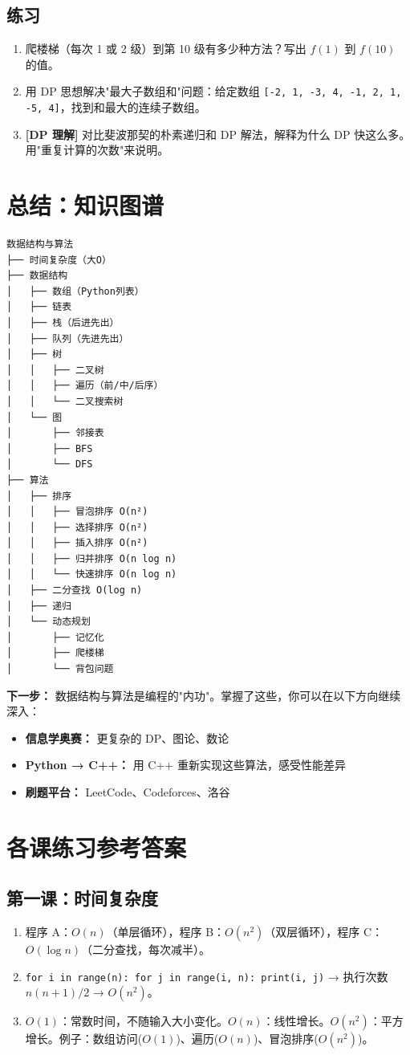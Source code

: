 \documentclass[a4paper,12pt]{ctexart}
\begin{document}
\subsection*{练习}

\begin{enumerate}
  \item 爬楼梯（每次 1 或 2 级）到第 10 级有多少种方法？写出 $f(1)$ 到 $f(10)$ 的值。
  \item 用 DP 思想解决"最大子数组和"问题：给定数组 \texttt{[-2, 1, -3, 4, -1, 2, 1, -5, 4]}，找到和最大的连续子数组。
  \item \textbf{[DP 理解]} 对比斐波那契的朴素递归和 DP 解法，解释为什么 DP 快这么多。用"重复计算的次数"来说明。
\end{enumerate}

\section*{总结：知识图谱}

\begin{verbatim}
数据结构与算法
├── 时间复杂度（大O）
├── 数据结构
│   ├── 数组（Python列表）
│   ├── 链表
│   ├── 栈（后进先出）
│   ├── 队列（先进先出）
│   ├── 树
│   │   ├── 二叉树
│   │   ├── 遍历（前/中/后序）
│   │   └── 二叉搜索树
│   └── 图
│       ├── 邻接表
│       ├── BFS
│       └── DFS
├── 算法
│   ├── 排序
│   │   ├── 冒泡排序 O(n²)
│   │   ├── 选择排序 O(n²)
│   │   ├── 插入排序 O(n²)
│   │   ├── 归并排序 O(n log n)
│   │   └── 快速排序 O(n log n)
│   ├── 二分查找 O(log n)
│   ├── 递归
│   └── 动态规划
│       ├── 记忆化
│       ├── 爬楼梯
│       └── 背包问题
\end{verbatim}

\textbf{下一步：} 数据结构与算法是编程的"内功"。掌握了这些，你可以在以下方向继续深入：
\begin{itemize}
  \item \textbf{信息学奥赛：} 更复杂的 DP、图论、数论
  \item \textbf{Python → C++：} 用 C++ 重新实现这些算法，感受性能差异
  \item \textbf{刷题平台：} LeetCode、Codeforces、洛谷
\end{itemize}

\section*{\textcolor{blue!70!black}{各课练习参考答案}}

\subsection*{第一课：时间复杂度}
\begin{enumerate}
  \item 程序 A：$O(n)$（单层循环），程序 B：$O(n^2)$（双层循环），程序 C：$O(\log n)$（二分查找，每次减半）。
  \item \texttt{for i in range(n): for j in range(i, n): print(i, j)} → 执行次数 $n(n+1)/2$ → $O(n^2)$。
  \item $O(1)$：常数时间，不随输入大小变化。$O(n)$：线性增长。$O(n^2)$：平方增长。例子：数组访问($O(1)$)、遍历($O(n)$)、冒泡排序($O(n^2)$)。
\end{enumerate}
\end{document}
